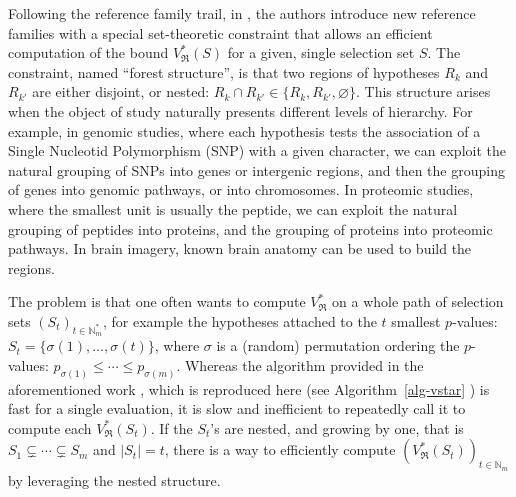\documentclass[
  11pt,
  a4paper,
]{article}
\theoremstyle{plain}
\theoremstyle{definition}
\theoremstyle{plain}
\theoremstyle{definition}
\theoremstyle{plain}
\theoremstyle{remark}
\begin{document}
Following the reference family trail, in \citet{MR4178188}, the authors
introduce new reference families with a special set-theoretic constraint
that allows an efficient computation of the bound
\(V^*_{\mathfrak{R}}(S)\) for a given, single selection set \(S\). The
constraint, named ``forest structure'', is that two regions of
hypotheses \(R_k\) and \(R_{k'}\) are either disjoint, or nested:
\(R_k\cap R_{k'}\in\{R_k,R_{k'},\varnothing\}\). This structure arises
when the object of study naturally presents different levels of
hierarchy. For example, in genomic studies, where each hypothesis tests
the association of a Single Nucleotid Polymorphism (SNP) with a given
character, we can exploit the natural grouping of SNPs into genes or
intergenic regions, and then the grouping of genes into genomic
pathways, or into chromosomes. In proteomic studies, where the smallest
unit is usually the peptide, we can exploit the natural grouping of
peptides into proteins, and the grouping of proteins into proteomic
pathways. In brain imagery, known brain anatomy can be used to build the
regions.

The problem is that one often wants to compute \(V^*_{\mathfrak{R}}\) on
a whole path of selection sets \((S_t)_{t\in\mathbb{N}_m^*}\), for
example the hypotheses attached to the \(t\) smallest \(p\)-values:
\(S_t=\{\sigma(1),\dots,\sigma(t)\}\), where \(\sigma\) is a (random)
permutation ordering the \(p\)-values:
\(p_{\sigma(1)}\leq\dotsb\leq p_{\sigma(m)}\). Whereas the algorithm
provided in the aforementioned work \citep[Algorithm 1]{MR4178188},
which is reproduced here (see  Algorithm~\ref{alg-vstar} ) is fast for a
single evaluation, it is slow and inefficient to repeatedly call it to
compute each \(V^*_{\mathfrak{R}}(S_t)\). If the \(S_t\)'s are nested,
and growing by one, that is \(S_1\subsetneq\dotsb\subsetneq S_m\) and
\(|S_t|=t\), there is a way to efficiently compute
\(\left(V^*_{\mathfrak{R}}(S_t)\right)_{t\in\mathbb{N}_m}\) by
leveraging the nested structure.
\end{document}

